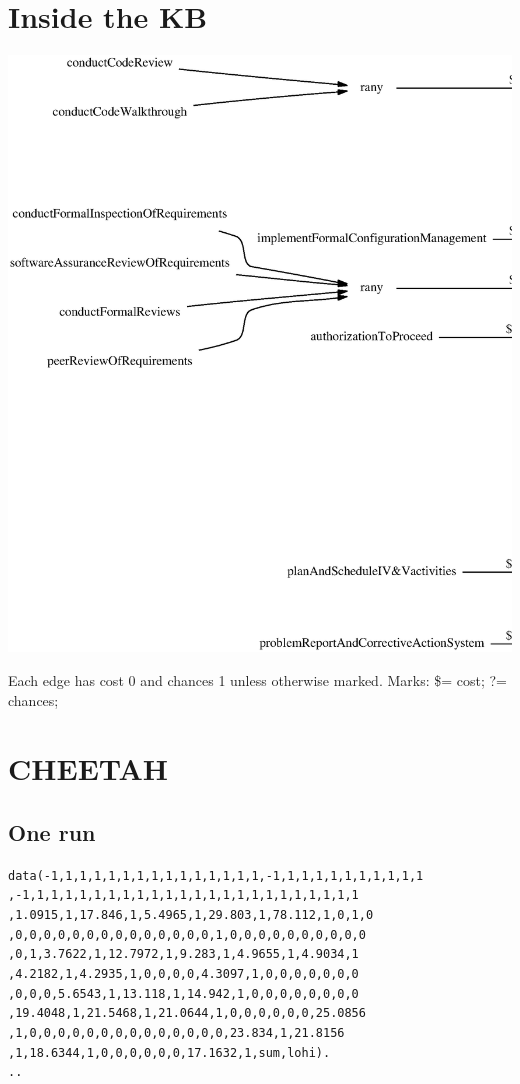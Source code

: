 \documentclass{article}
\begin{document}
\pagebreak
\section{Inside the KB}

\centerline{\includegraphics[width=6in]{kb.eps}}

{\footnotesize
Each edge has cost
0 and chances 1 unless otherwise
marked. Marks: \$= cost; ?= chances;}

\pagebreak
\section{CHEETAH}

\subsection{One run}
{\footnotesize
\begin{alltt}
data(-1,1,1,1,1,1,1,1,1,1,1,1,1,1,1,-1,1,1,1,1,1,1,1,1,1,1
    ,-1,1,1,1,1,1,1,1,1,1,1,1,1,1,1,1,1,1,1,1,1,1,1,1
    ,1.0915,1,17.846,1,5.4965,1,29.803,1,78.112,1,0,1,0
    ,0,0,0,0,0,0,0,0,0,0,0,0,0,0,1,0,0,0,0,0,0,0,0,0,0
    ,0,1,3.7622,1,12.7972,1,9.283,1,4.9655,1,4.9034,1
    ,4.2182,1,4.2935,1,0,0,0,0,4.3097,1,0,0,0,0,0,0,0
    ,0,0,0,5.6543,1,13.118,1,14.942,1,0,0,0,0,0,0,0,0
    ,19.4048,1,21.5468,1,21.0644,1,0,0,0,0,0,0,25.0856
    ,1,0,0,0,0,0,0,0,0,0,0,0,0,0,0,23.834,1,21.8156
    ,1,18.6344,1,0,0,0,0,0,0,17.1632,1,sum,lohi).
..
\end{alltt}}
\end{document}
